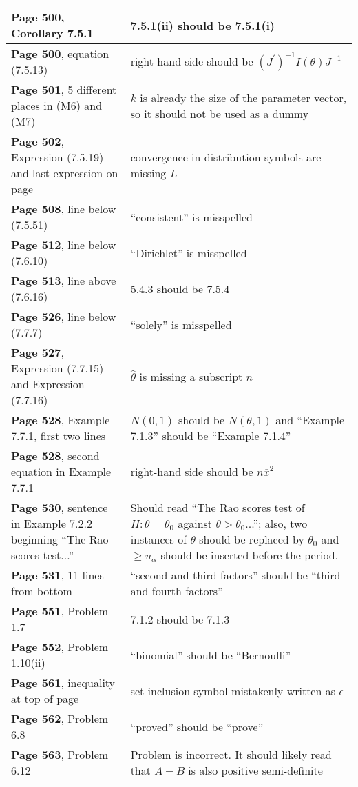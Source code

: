 \documentclass[10pt, a4paper]{article}
\begin{document}
\begin{longtable}{|R{.40\textwidth}|R{.55\textwidth}|}
\textbf{Page 500}, Corollary 7.5.1 & 7.5.1(ii) should be 7.5.1(i) \\ \hline
\textbf{Page 500}, equation (7.5.13) & right-hand side should be $(J^\prime)^{-1}I(\theta)J^{-1}$ \\ \hline
\textbf{Page 501}, 5 different places in (M6) and (M7) & $k$ is already the size of the parameter vector, so it should not be used as a dummy \\ \hline
\textbf{Page 502}, Expression (7.5.19) and last expression on page & convergence in distribution symbols are missing $L$ \\ \hline
\textbf{Page 508}, line below (7.5.51) & ``consistent'' is misspelled \\ \hline
\textbf{Page 512}, line below (7.6.10) & ``Dirichlet'' is misspelled \\ \hline
\textbf{Page 513}, line above (7.6.16) & 5.4.3 should be 7.5.4 \\ \hline
\textbf{Page 526}, line below (7.7.7) & ``solely'' is misspelled \\ \hline
\textbf{Page 527}, Expression (7.7.15) and Expression (7.7.16) & $\widehat{\theta}$ is missing a subscript $n$ \\ \hline
\textbf{Page 528}, Example 7.7.1, first two lines & $N(0,1)$ should be $N(\theta,1)$ and ``Example 7.1.3'' should be ``Example 7.1.4'' \\ \hline
\textbf{Page 528}, second equation in Example 7.7.1 & right-hand side should be $n\overline{x}^2$ \\ \hline
\textbf{Page 530}, sentence in Example 7.2.2 beginning ``The Rao scores test...'' & Should read ``The Rao scores test of $H:\theta=\theta_0$ against $\theta>\theta_0$...''; also, two instances of $\theta$ should be replaced by $\theta_0$ and $\geq u_\alpha$ should be inserted before the period. \\ \hline
\textbf{Page 531}, 11 lines from bottom & ``second and third factors'' should be ``third and fourth factors'' \\ \hline
\textbf{Page 551}, Problem 1.7 & 7.1.2 should be 7.1.3 \\ \hline
\textbf{Page 552}, Problem 1.10(ii) & ``binomial'' should be ``Bernoulli'' \\ \hline
\textbf{Page 561}, inequality at top of page & set inclusion symbol mistakenly written as $\epsilon$ \\ \hline
\textbf{Page 562}, Problem 6.8 & ``proved'' should be ``prove'' \\ \hline
\textbf{Page 563}, Problem 6.12 & Problem is incorrect. It should likely read that $A-B$ is also positive semi-definite \\ \hline

\end{longtable}
\end{document}
